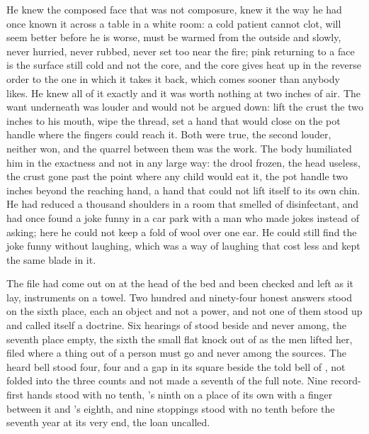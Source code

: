 He knew the composed face that was not composure, knew it the way he had once known it across a table in a white room: a cold patient cannot clot, will seem better before he is worse, must be warmed from the outside and slowly, never hurried, never rubbed, never set too near the fire; pink returning to a face is the surface still cold and not the core, and the core gives heat up in the reverse order to the one in which it takes it back, which comes sooner than anybody likes. He knew all of it exactly and it was worth nothing at two inches of air. The want underneath was louder and would not be argued down: lift the crust the two inches to his mouth, wipe the thread, set a hand that would close on the pot handle where the fingers could reach it. Both were true, the second louder, neither won, and the quarrel between them was the work. The body humiliated him in the exactness and not in any large way: the drool frozen, the head useless, the crust gone past the point where any child would eat it, the pot handle two inches beyond the reaching hand, a hand that could not lift itself to its own chin. He had reduced a thousand shoulders in a room that smelled of disinfectant, and had once found a joke funny in a car park with a man who made jokes instead of asking; here he could not keep a fold of wool over one ear. He could still find the joke funny without laughing, which was a way of laughing that cost less and kept the same blade in it.

\scenebreak

The file had come out on  at the head of the bed and been checked and left as it lay, instruments on a towel. Two hundred and ninety-four honest answers stood on the sixth place, each an object and not a power, and not one of them stood up and called itself a doctrine. Six hearings of  stood beside and never among, the seventh place empty, the sixth the small flat knock out of  as the men lifted her, filed where a thing out of a person must go and never among the sources. The heard bell stood four, four and a gap in its square beside the told bell of , not folded into the three counts and not made a seventh of the full note. Nine record-first hands stood with no tenth, 's ninth on a place of its own with a finger between it and 's eighth, and nine stoppings stood with no tenth before the seventh year at its very end, the loan uncalled.

